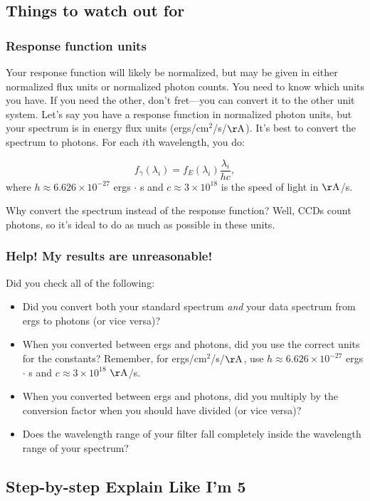 \subsection{Things to watch out for}
\subsubsection{Response function units}
Your response function will likely be normalized, but may be given in either normalized flux units or normalized photon counts. You need to know which units you have. If you need the other, don't fret---you can convert it to the other unit system. Let's say you have a response function in normalized photon units, but your spectrum is in energy flux units (ergs/cm$^{2}$/s/$\mathrm{\AA}$). It's best to convert the spectrum to photons. For each $i$th wavelength, you do:

\begin{equation}
    f_{\gamma}(\lambda_{i}) = f_{E}(\lambda_{i})\frac{\lambda_{i}}{hc},
\end{equation}
where $h \approx 6.626 \times 10^{-27}$ ergs $\cdot$ s and $c \approx 3\times 10^{18}$ is the speed of light in $\mathrm{\AA}$/s. 

Why convert the spectrum instead of the response function? Well, CCDs count photons, so it's ideal to do as much as possible in these units. 

\subsubsection{Help! My results are unreasonable!}

Did you check all of the following:
\begin{itemize}
    \item Did you convert both your standard spectrum \textit{and} your data spectrum from ergs to photons (or vice versa)?
    \item When you converted between ergs and photons, did you use the correct units for the constants? Remember, for ergs/cm$^{2}$/s/$\mathrm{\AA}$, use $h \approx 6.626 \times 10^{-27}$ ergs $\cdot$ s and $c \approx 3\times 10^{18}$ $\mathrm{\AA}$/s. 
    \item When you converted between ergs and photons, did you multiply by the conversion factor when you should have divided (or vice versa)? 
    \item Does the wavelength range of your filter fall completely inside the wavelength range of your spectrum? 
\end{itemize}

\subsection{Step-by-step Explain Like I'm 5}